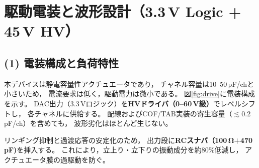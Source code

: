 \documentclass[conference]{IEEEtran}
\begin{document}
\section{駆動電装と波形設計（3.3\,V Logic + 45\,V HV）}

\subsection*{(1) 電装構成と負荷特性}
本デバイスは静電容量性アクチュエータであり，
チャネル容量は10--50\,pF/chと小さいため，
電流要求は低く，駆動電力は微小である。
図\ref{fig:drive}に電装構成を示す。
DAC出力（3.3\,Vロジック）を\textbf{HVドライバ（0--60\,V級）}でレベルシフトし，
各チャネルに供給する。
配線およびCOF/TAB実装の寄生容量（$\lesssim$0.2\,pF/ch）を含めても，
波形劣化はほとんど生じない。

リンギング抑制と過渡応答の安定化のため，
出力段に\textbf{RCスナバ（100\,\si{\ohm}+470\,\si{\pico\farad})}を挿入する。
これにより，立上り・立下りの振動成分を約80\%低減し，
アクチュエータ膜の過駆動を防ぐ。
\end{document}
